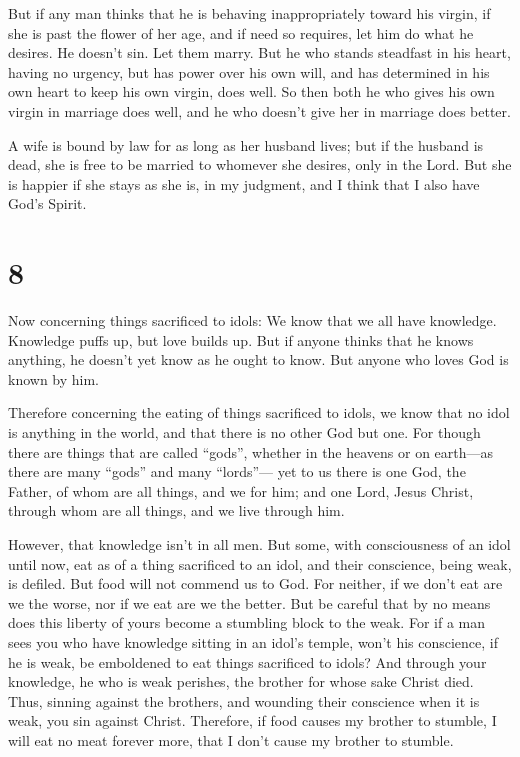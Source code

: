  But if any man thinks that he is behaving inappropriately
toward his virgin, if she is past the flower of her age, and if need so
requires, let him do what he desires. He doesn't sin. Let them marry.
 But he who stands steadfast in his heart, having no
urgency, but has power over his own will, and has determined in his own
heart to keep his own virgin, does well.  So then both he
who gives his own virgin in marriage does well, and he who doesn't give
her in marriage does better.

 A wife is bound by law for as long as her husband lives;
but if the husband is dead, she is free to be married to whomever she
desires, only in the Lord.  But she is happier if she stays
as she is, in my judgment, and I think that I also have God's Spirit.

\hypertarget{section-7}{%
\section{8}\label{section-7}}

 Now concerning things sacrificed to idols: We know that we
all have knowledge. Knowledge puffs up, but love builds up. 
But if anyone thinks that he knows anything, he doesn't yet know as he
ought to know.  But anyone who loves God is known by him.

 Therefore concerning the eating of things sacrificed to
idols, we know that no idol is anything in the world, and that there is
no other God but one.  For though there are things that are
called ``gods'', whether in the heavens or on earth---as there are many
``gods'' and many ``lords''---  yet to us there is one God,
the Father, of whom are all things, and we for him; and one Lord, Jesus
Christ, through whom are all things, and we live through him.

 However, that knowledge isn't in all men. But some, with
consciousness of an idol until now, eat as of a thing sacrificed to an
idol, and their conscience, being weak, is defiled.  But
food will not commend us to God. For neither, if we don't eat are we the
worse, nor if we eat are we the better.  But be careful that
by no means does this liberty of yours become a stumbling block to the
weak.  For if a man sees you who have knowledge sitting in
an idol's temple, won't his conscience, if he is weak, be emboldened to
eat things sacrificed to idols?  And through your
knowledge, he who is weak perishes, the brother for whose sake Christ
died.  Thus, sinning against the brothers, and wounding
their conscience when it is weak, you sin against Christ. 
Therefore, if food causes my brother to stumble, I will eat no meat
forever more, that I don't cause my brother to stumble.

